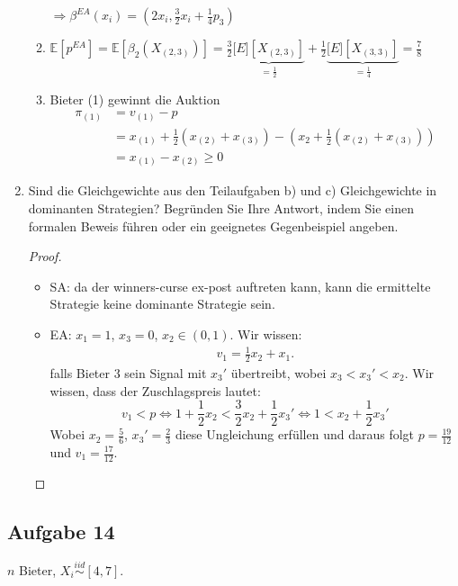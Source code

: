 \documentclass[12pt]{extreport} %
\theoremstyle{named}
\theoremstyle{itshape}
\theoremstyle{normal}
\begin{document}
\begin{enumerate}
\begin{enumerate}
	 			$\Rightarrow \beta^{EA}(x_{i}) = \left( 2 x_{i}, \frac{3}{2} x_{i} + \frac{1}{4} p_{3} \right)$
	 		\item $\mathds{E}\left[ p^{EA} \right] = \mathds{E}\left[ \beta_{2} \left( X_{(2,3)} \right) \right] = \frac{3}{2} \underbrace{\mathds[E] \left[ X_{(2,3)} \right]}_{= \frac{1}{2}} + \frac{1}{2} \underbrace{\mathds[E] \left[ X_{(3,3)} \right]}_{= \frac{1}{4}} = \frac{7}{8}$
	 		\item Bieter (1) gewinnt die Auktion
	 			\begin{align*}
	 				\pi_{(1)} & = v_{(1)} - p \\
	 						& = x_{(1)} + \frac{1}{2} \left( x_{(2)} + x_{(3)} \right) - \left( x_{2} + \frac{1}{2} \left( x_{(2)} + x_{(3)} \right) \right) \\
	 						& = x_{(1)} - x_{(2)} \geq 0
	 			\end{align*} 
		  \end{enumerate}
	\item Sind die Gleichgewichte aus den Teilaufgaben b) und c) Gleichgewichte in dominanten Strategien? Begründen Sie Ihre Antwort, indem Sie einen formalen Beweis führen oder ein geeignetes Gegenbeispiel angeben.
		\begin{proof}
			\begin{itemize}
				\item SA: da der winners-curse ex-post auftreten kann, kann die ermittelte Strategie keine dominante Strategie sein.
				\item EA: $x_1 = 1$, $x_3 = 0$, $x_2 \in (0, 1)$. Wir wissen:
					\begin{align*}
						v_1 = \frac{1}{2} x_2 + x_1.
					\end{align*}
					falls Bieter 3 sein Signal mit $x_3'$ übertreibt, wobei $x_3 < x_3' < x_2$. Wir wissen, dass der Zuschlagspreis lautet:
					$$ v_1 < p \iff 1 + \frac{1}{2} x_2 < \frac{3}{2} x_2 + \frac{1}{2} x_3' \iff 1 < x_2 + \frac{1}{2} x_3' $$
					Wobei $x_2  = \frac{5}{6}$, $x_3' = \frac{2}{3}$ diese Ungleichung erfüllen und daraus folgt $p = \frac{19}{12}$ und $v_1 = \frac{17}{12}$.
			\end{itemize}
		\end{proof}
\end{enumerate}

\subsection*{Aufgabe 14}

$n$ Bieter, $X_{i} \overset{iid}{\sim} [4, 7]$.
\end{document}
